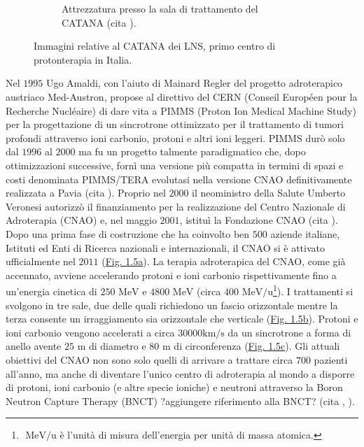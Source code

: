 \documentclass[12pt,a4paper,twoside]{report}
\begin{document}
\begin{figure}[H]
\begin{subfigure}[b]{0.49\textwidth}
			\caption{Attrezzatura presso la sala di trattamento del CATANA (cita
				).}
			\label{fig:catana2}
		\end{subfigure}
		\caption{Immagini relative al CATANA dei LNS, primo centro di protonterapia in Italia.}
		\label{fig:catana}
	\end{figure}
	
	Nel $1995$ Ugo Amaldi, con l'aiuto di Mainard Regler del progetto adroterapico austriaco Med-Austron, propose al direttivo del CERN (Conseil Européen pour la Recherche Nucléaire) di dare vita a PIMMS (Proton Ion Medical Machine Study) per la progettazione di un sincrotrone ottimizzato per il trattamento di tumori profondi attraverso ioni carbonio, protoni e altri ioni leggeri. PIMMS durò solo dal $1996$ al $2000$ ma fu un progetto talmente paradigmatico che, dopo ottimizzazioni successive, fornì una versione più compatta in termini di spazi e costi denominata PIMMS/TERA evolutasi nella versione CNAO definitivamente realizzata a Pavia (cita
	). Proprio nel $2000$ il neoministro della Salute Umberto Veronesi autorizzò il finanziamento per la realizzazione del Centro Nazionale di Adroterapia (CNAO) e, nel maggio $2001$, istituì la Fondazione CNAO (cita
	). Dopo una prima fase di costruzione che ha coinvolto ben $500$ aziende italiane, Istituti ed Enti di Ricerca nazionali e internazionali, il CNAO si è attivato ufficialmente nel $2011$ (\hyperref[fig:edificio_cnao]{Fig. 1.5a}). La terapia adroterapica del CNAO, come già accennato, avviene accelerando protoni e ioni carbonio rispettivamente fino a un'energia cinetica di $250 \mbox{ MeV}$ e $4800\mbox{ MeV}$ (circa $400\mbox{ MeV/u}$\footnote{$\mbox{ MeV/u}$ è l'unità di misura dell'energia per unità di massa atomica.}). I trattamenti si svolgono in tre sale, due delle quali richiedono un fascio orizzontale mentre la terza consente un irraggiamento sia orizzontale che verticale (\hyperref[fig:sala_cnao]{Fig. 1.5b}). Protoni e ioni carbonio vengono accelerati a circa $30000\mbox{km/s}$ da un sincrotrone a forma di anello avente $25\mbox{ m}$ di diametro e $80\mbox{ m}$ di circonferenza (\hyperref[fig:sincrotrone_cnao]{Fig. 1.5c}). Gli attuali obiettivi del CNAO non sono solo quelli di arrivare a trattare circa $700$ pazienti all’anno, ma anche di diventare l’unico centro di adroterapia al mondo a disporre di protoni, ioni carbonio (e altre specie ioniche) e neutroni attraverso la Boron Neutron Capture Therapy (BNCT) ?aggiungere riferimento alla BNCT? (cita
	,
	).
	
\end{document}
